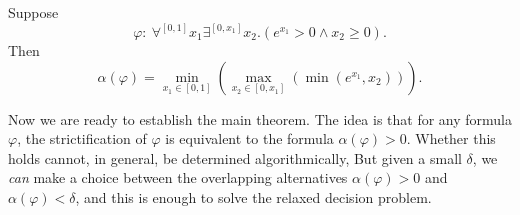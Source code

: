 \documentclass[prodmode]{acmsmall} %
\begin{document}
\begin{example}
Suppose  
$$\varphi:\ \forall^{[0,1]} x_1 \exists^{[0,x_1]} x_2. (e^{x_1}>0\wedge x_2\geq 0).$$ Then 
$$\alpha(\varphi) = \min_{x_1\in[0,1]}(\max_{x_2\in[0,x_1]}(\min(e^{x_1}, x_2))).$$ 
\end{example}

Now we are ready to establish the main theorem. The idea is that for any formula $\varphi$, the strictification of $\varphi$ is equivalent to the formula $\alpha(\varphi) > 0$. Whether this holds cannot, in general, be determined algorithmically, But given a small $\delta$, we {\em can} make a choice between the overlapping alternatives $\alpha(\varphi) > 0$ and $\alpha(\varphi) < \delta$, and this is enough to solve the relaxed decision problem.\\
\end{document}
